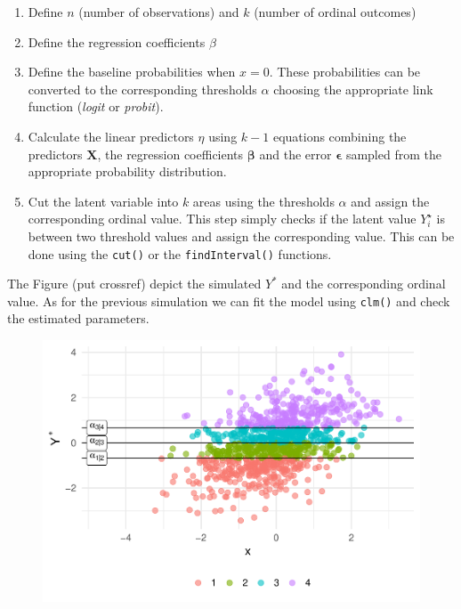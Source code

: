\documentclass[
  man,floatsintext]{apa6}
\providecommand{\tightlist}{%
  \setlength{\itemsep}{0pt}\setlength{\parskip}{0pt}}
\begin{document}
\begin{enumerate}
\def\labelenumi{\arabic{enumi}.}
\tightlist
\item
  Define \(n\) (number of observations) and \(k\) (number of ordinal outcomes)
\item
  Define the regression coefficients \(\beta\)
\item
  Define the baseline probabilities when \(x = 0\). These probabilities can be converted to the corresponding thresholds \(\alpha\) choosing the appropriate link function (\emph{logit} or \emph{probit}).
\item
  Calculate the linear predictors \(\eta\) using \(k - 1\) equations combining the predictors \(\mathbf{X}\), the regression coefficients \(\boldsymbol{\beta}\) and the error \(\mathbf{\epsilon}\) sampled from the appropriate probability distribution.
\item
  Cut the latent variable into \(k\) areas using the thresholds \(\alpha\) and assign the corresponding ordinal value. This step simply checks if the latent value \(Y^{\star}_i\) is between two threshold values and assign the corresponding value. This can be done using the \texttt{cut()} or the \texttt{findInterval()} functions.
\end{enumerate}

\scriptsize

\normalsize

The Figure (put crossref) depict the simulated \(Y^{*}\) and the corresponding ordinal value. As for the previous simulation we can fit the model using \texttt{clm()} and check the estimated parameters.

\scriptsize

\begin{figure}

{\centering \includegraphics{paper-new_files/figure-latex/unnamed-chunk-12-1} 

}

\caption{ }\label{fig:unnamed-chunk-12}
\end{figure}
\end{document}
